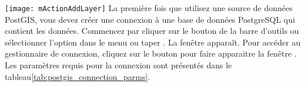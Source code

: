 \texttt{[image: mActionAddLayer]}
La premi\`ere fois que utilisez une source de donn\'ees PostGIS, vous devez cr\'eer une connexion \`a une base de donn\'ees PostgreSQL qui contient les donn\'ees. Commencez par cliquer sur le bouton  de la barre d'outils ou s\'electionner l'option  dans le menu  ou taper .
La fen\^etre  appara\^it. Pour acc\'eder au gestionnaire de connexion, cliquez sur le bouton  pour faire apparaitre la fen\^etre . Les param\`etres requis pour la connexion sont pr\'esent\'es dans le tableau\ref{tab:postgis_connection_parms}.

